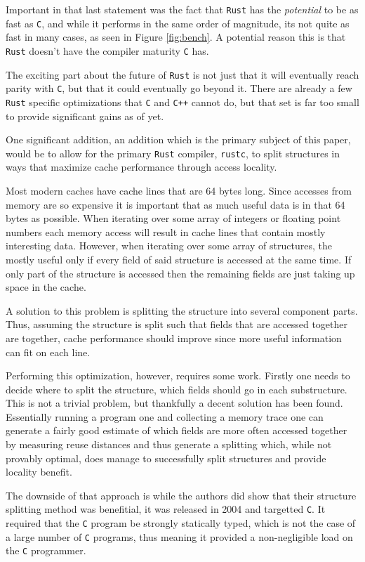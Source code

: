 \documentclass[12pt,oneside]{book}
\newcommand{\rustname}{{\texttt{Rust}}}
\def \rust {\rustname{}\xspace}
\newcommand{\rustcname}{{\texttt{rustc}}}
\def \rustc {\rustcname{}\xspace}
\newcommand{\cname}{{\texttt{C}}}
\def \c {\cname{}\xspace}
\newcommand{\cppname}{{\texttt{C++}}}
\def \cpp {\cppname{}\xspace}
\begin{document}
Important in that last statement was the fact that \rust has the \textit{potential}
to be as fast as \c, and while it performs in the same order of magnitude, its not
quite as fast in many cases, as seen in Figure \ref{fig:bench}.
A potential reason this is that \rust doesn't have the compiler maturity \c has.

The exciting part about the future of \rust is not just that it will eventually
reach parity with \c, but that it could eventually go beyond it. There are
already a few \rust specific optimizations that \c and \cpp cannot do, but that
set is far too small to provide significant gains as of yet.

One significant addition, an addition which is the primary subject of this
paper, would be to allow for the primary \rust compiler, \rustc, to split
structures in ways that maximize cache performance through access locality.

Most modern caches have cache lines that are 64 bytes long. Since accesses from
memory are so expensive it is important that as much useful data is in that 64
bytes as possible. When iterating over some array of integers or floating point
numbers each memory access will result in cache lines that contain mostly
interesting data. However, when iterating over some array of structures,
the mostly useful only
if every field of said structure is accessed at the same time. If only part of
the structure is accessed then the remaining fields are just taking up space in
the cache.

A solution to this problem is splitting the structure into several component
parts. Thus, assuming the structure is split such that fields that are accessed
together are together, cache performance should improve since more useful 
information can fit on each line.

Performing this optimization, however, requires some work. Firstly one
needs to decide where to split the structure, which fields should go in
each substructure. This is not a trivial problem, but thankfully a decent
solution has been found\cite{Zhong:2004:ARS:996893.996872}.
Essentially running a program one and collecting
a memory trace one can generate a fairly good estimate of which fields are more
often accessed together by measuring reuse distances and thus generate a splitting
which, while not provably optimal, does manage to successfully split structures and
provide locality benefit.

The downside of that approach is while the authors did show that their
structure splitting method was benefitial, it was released in 2004 and targetted
\c. It required that the \c program be strongly statically typed, which is
not the case of a large number of \c programs, thus meaning it provided a non-negligible
load on the \c programmer. 
\end{document}
